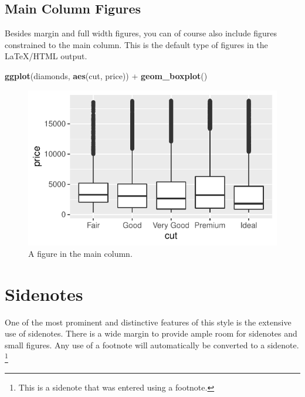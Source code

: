 \documentclass[]{tufte-book}
\newenvironment{Shaded}{}{}
\newcommand{\KeywordTok}[1]{\textcolor[rgb]{0.00,0.44,0.13}{\textbf{#1}}}
\newcommand{\NormalTok}[1]{#1}
\newcommand{\OperatorTok}[1]{\textcolor[rgb]{0.40,0.40,0.40}{#1}}
\newcommand{\StringTok}[1]{\textcolor[rgb]{0.25,0.44,0.63}{#1}}
\begin{document}
\hypertarget{main-column-figures}{%
\section{Main Column Figures}\label{main-column-figures}}

Besides margin and full width figures, you can of course also include
figures constrained to the main column. This is the default type of
figures in the LaTeX/HTML output.

\begin{Shaded}
\begin{Highlighting}[]
\KeywordTok{ggplot}\NormalTok{(diamonds, }\KeywordTok{aes}\NormalTok{(cut, price)) }\OperatorTok{+}\StringTok{ }\KeywordTok{geom_boxplot}\NormalTok{()}
\end{Highlighting}
\end{Shaded}

\begin{figure}
\includegraphics{deleteme_files/figure-latex/fig-main-1} \caption[A figure in the main column]{A figure in the main column.}\label{fig:fig-main}
\end{figure}

\hypertarget{sidenotes}{%
\chapter{Sidenotes}\label{sidenotes}}

One of the most prominent and distinctive features of this style is the
extensive use of sidenotes. There is a wide margin to provide ample room
for sidenotes and small figures. Any use of a footnote will
automatically be converted to a sidenote. \footnote{This is a sidenote
  that was entered using a footnote.}
\end{document}
